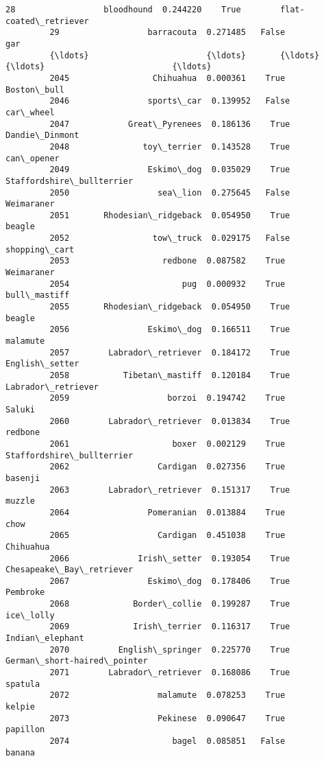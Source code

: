 \documentclass[11pt]{article}
\begin{document}
\begin{Verbatim}[commandchars=\\\{\}]
         28                  bloodhound  0.244220    True        flat-coated\_retriever   
         29                  barracouta  0.271485   False                          gar   
         {\ldots}                        {\ldots}       {\ldots}     {\ldots}                          {\ldots}   
         2045                 Chihuahua  0.000361    True                  Boston\_bull   
         2046                sports\_car  0.139952   False                    car\_wheel   
         2047            Great\_Pyrenees  0.186136    True               Dandie\_Dinmont   
         2048               toy\_terrier  0.143528    True                   can\_opener   
         2049                Eskimo\_dog  0.035029    True    Staffordshire\_bullterrier   
         2050                  sea\_lion  0.275645   False                   Weimaraner   
         2051       Rhodesian\_ridgeback  0.054950    True                       beagle   
         2052                 tow\_truck  0.029175   False                shopping\_cart   
         2053                   redbone  0.087582    True                   Weimaraner   
         2054                       pug  0.000932    True                 bull\_mastiff   
         2055       Rhodesian\_ridgeback  0.054950    True                       beagle   
         2056                Eskimo\_dog  0.166511    True                     malamute   
         2057        Labrador\_retriever  0.184172    True               English\_setter   
         2058           Tibetan\_mastiff  0.120184    True           Labrador\_retriever   
         2059                    borzoi  0.194742    True                       Saluki   
         2060        Labrador\_retriever  0.013834    True                      redbone   
         2061                     boxer  0.002129    True    Staffordshire\_bullterrier   
         2062                  Cardigan  0.027356    True                      basenji   
         2063        Labrador\_retriever  0.151317    True                       muzzle   
         2064                Pomeranian  0.013884    True                         chow   
         2065                  Cardigan  0.451038    True                    Chihuahua   
         2066              Irish\_setter  0.193054    True     Chesapeake\_Bay\_retriever   
         2067                Eskimo\_dog  0.178406    True                     Pembroke   
         2068             Border\_collie  0.199287    True                    ice\_lolly   
         2069             Irish\_terrier  0.116317    True              Indian\_elephant   
         2070          English\_springer  0.225770    True  German\_short-haired\_pointer   
         2071        Labrador\_retriever  0.168086    True                      spatula   
         2072                  malamute  0.078253    True                       kelpie   
         2073                  Pekinese  0.090647    True                     papillon   
         2074                     bagel  0.085851   False                       banana   
         

\end{Verbatim}
\end{document}
